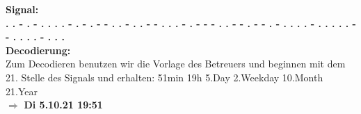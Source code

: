 \textbf{Signal:}\\
\textbf{. . - . - . . . . - 
        . - . - - . . - . . 
        - - . . . - . - - - 
        . . - - . - - . - . 
        . . . - . . . . . - 
        - . . . . - . . . }\\
\textbf{Decodierung:}\\
Zum Decodieren benutzen wir die Vorlage des Betreuers und beginnen mit dem 21. Stelle des Signals und erhalten: 51min 19h 5.Day 2.Weekday 10.Month 21.Year \\$\Rightarrow$ \textbf{Di 5.10.21 19:51}

